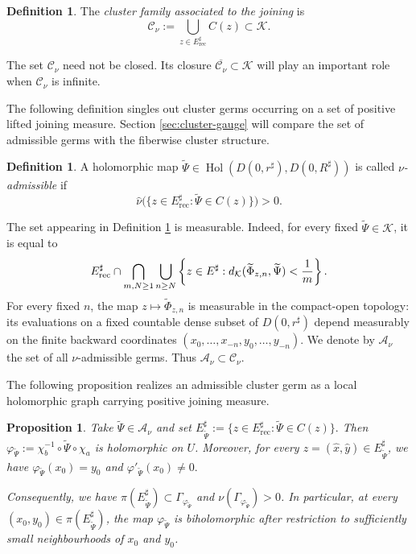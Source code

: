 \documentclass[11pt]{amsart}
\numberwithin{equation}{section}
\theoremstyle{plain}
\newtheorem{prop}[thm]{Proposition}
\theoremstyle{definition}
\newtheorem{defn}[thm]{Definition}
\theoremstyle{remark}
\begin{document}
\begin{defn}\label{def:Cnu}
The \emph{cluster family associated to the joining} is
$$
\mathcal C_\nu
:=
\bigcup_{z\in E^\sharp_{\mathrm{rec}}}
C(z)
\subset\mathcal K.
$$
\end{defn}

The set $\mathcal C_\nu$ need not be closed. Its closure
$\overline{\mathcal C_\nu}\subset\mathcal K$ will play an important
role when $\mathcal C_\nu$ is infinite.

\smallskip

The following definition singles out cluster germs occurring on a
set of positive lifted joining measure. Section
\ref{sec:cluster-gauge} will compare 
the set of admissible germs
with the fiberwise cluster structure.

\begin{defn}\label{def:admissible-germs}
A holomorphic map
$
\widetilde\Psi
\in
\operatorname{Hol}
(D(0,r^\sharp),D(0,R^\sharp))
$
is called \emph{$\nu$-admissible} if
$$
\hat\nu
\bigl(
\{
z\in E^\sharp_{\mathrm{rec}}:
\widetilde\Psi\in C(z)
\}
\bigr)>0.
$$
\end{defn}

The set appearing in Definition
\ref{def:admissible-germs} is measurable. Indeed, for every fixed
$\widetilde\Psi\in\mathcal K$, it is equal to
$$
E^\sharp_{\rm rec}\cap
\bigcap_{m,N\geq1}
\bigcup_{n\geq N}
\left\{
z\in E^\sharp:
d_{\mathcal K}
(\widetilde\Phi_{z,n},\widetilde\Psi)
<
\frac1m
\right\}.
$$
For every fixed $n$, the map
$z\mapsto\widetilde\Phi_{z,n}$ is measurable in the compact-open
topology: its evaluations on a fixed countable dense subset of
$D(0,r^\sharp)$ depend measurably on the finite backward coordinates
$(x_0,\ldots,x_{-n},y_0,\ldots,y_{-n})$.
We denote by $\mathcal A_\nu$ the set of all
$\nu$-admissible germs.
Thus $\mathcal A_\nu\subset\mathcal C_\nu$. 

\smallskip

The following proposition realizes an admissible cluster germ as a
local holomorphic graph carrying positive joining measure.

\begin{prop}\label{prop:realization-admissible-germs}
Take $\widetilde\Psi\in\mathcal A_\nu$ and set
$
E^\sharp_{\widetilde\Psi}
:=
\{
z\in E^\sharp_{\mathrm{rec}}:
\widetilde\Psi\in C(z)
\}.
$
Then
$\varphi_{\widetilde\Psi}
:=\chi_b^{-1}\circ\widetilde\Psi\circ\chi_a$
is holomorphic on $U$. Moreover, for every
$z=(\hat x,\hat y)\in E^\sharp_{\widetilde\Psi}$,
we have
$\varphi_{\widetilde\Psi}(x_0)=y_0$ and $\varphi'_{\widetilde\Psi}(x_0)\neq0.$

Consequently, we have
$\pi(E^\sharp_{\widetilde\Psi})
\subset\Gamma_{\varphi_{\widetilde\Psi}}$
and
$\nu(\Gamma_{\varphi_{\widetilde\Psi}})>0$.
In particular, at every
$(x_0,y_0)\in\pi(E^\sharp_{\widetilde\Psi})$, the map
$\varphi_{\widetilde\Psi}$ is biholomorphic after restriction to
sufficiently small neighbourhoods of $x_0$ and $y_0$.
\end{prop}
\end{document}
